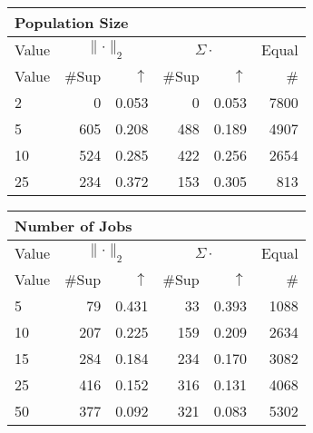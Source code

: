\begin{center}
\renewcommand{\tabcolsep}{4pt}
\renewcommand{\arraystretch}{1.1}
\begin{customnormal}
\begin{tabular}{lrrrrr}
\multicolumn{6}{l}{Population Size}\\
\toprule
\multicolumn{1}{c}{Value} & \multicolumn{2}{c}{$\lVert \cdot \rVert_2$} & \multicolumn{2}{c}{$\Sigma \cdot$} & \multicolumn{1}{c}{Equal} \\ 
\cmidrule(lr){1-1} \cmidrule(lr){2-3} \cmidrule(lr){4-5}  \cmidrule(lr){6-6}
Value & \#Sup & $\uparrow$ & \#Sup & $\uparrow$ & \# \\ 
\midrule
2 & 0 & 0.053 & 0 & 0.053 & 7800 \\ 
5 & 605 & 0.208 & 488 & 0.189 & 4907 \\ 
10 & 524 & 0.285 & 422 & 0.256 & 2654 \\ 
25 & 234 & 0.372 & 153 & 0.305 & 813 \\ 
\bottomrule
\end{tabular}


\end{customnormal}
\end{center}
\begin{center}
\renewcommand{\tabcolsep}{4pt}
\renewcommand{\arraystretch}{1.1}
\begin{customnormal}
\begin{tabular}{lrrrrr}
\multicolumn{6}{l}{Number of Jobs}\\
\toprule
\multicolumn{1}{c}{Value} & \multicolumn{2}{c}{$\lVert \cdot \rVert_2$} & \multicolumn{2}{c}{$\Sigma \cdot$} & \multicolumn{1}{c}{Equal} \\ 
\cmidrule(lr){1-1} \cmidrule(lr){2-3} \cmidrule(lr){4-5}  \cmidrule(lr){6-6}
Value & \#Sup & $\uparrow$ & \#Sup & $\uparrow$ & \# \\ 
\midrule
5 & 79 & 0.431 & 33 & 0.393 & 1088 \\ 
10 & 207 & 0.225 & 159 & 0.209 & 2634 \\ 
15 & 284 & 0.184 & 234 & 0.170 & 3082 \\ 
25 & 416 & 0.152 & 316 & 0.131 & 4068 \\ 
50 & 377 & 0.092 & 321 & 0.083 & 5302 \\ 
\bottomrule
\end{tabular}


\end{customnormal}
\end{center}
